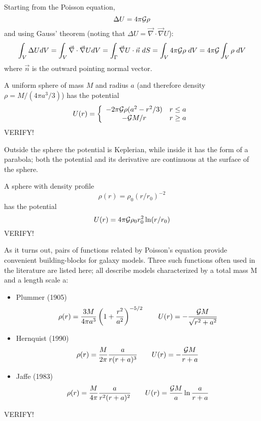 
Starting from the Poisson equation, 
\[
\Delta U = 4 \pi {\cal G} \rho
\]
and using Gauss' theorem (noting that $\Delta U=\vec\nabla\cdot \vec\nabla U$):
\[
\int_V \Delta U dV = \int_V \vec\nabla\cdot \vec\nabla U dV = 
\int_\Gamma \vec\nabla U \cdot \vec{n} \; dS
= \int_V 4 \pi {\cal G} \rho \; dV
= 4 \pi {\cal G} \int_V \rho \; dV
\]
where $\vec{n}$ is the outward pointing normal vector.

A uniform sphere of mass $M$ and radius $a$ (and therefore density $\rho=M/(4\pi a^3/3)$) 
has the potential
\[
U(r) =
\left\{
\begin{array}{cc}
-2\pi {\cal G} \rho (a^2-r^2/3) & r \le a \\
-{\cal G} M/r & r\ge a
\end{array}
\right.
\]
VERIFY!

Outside the sphere the potential is Keplerian, while inside it has the form of a parabola; 
both the potential and its derivative are continuous at the surface of the sphere.

A sphere with density profile 
\[
\rho(r) = \rho_0 (r/r_0)^{-2}
\]
has the potential 
\[
U(r) = 4\pi {\cal G} \rho_0 r_0^2 \ln (r/r_0)
\]
VERIFY!

As it turns out, pairs of functions related by Poisson's equation provide 
convenient building-blocks for galaxy models. 
Three such functions often used in the literature are listed here; all describe models characterized
by a total mass M and a length scale a:

\begin{itemize}
\item Plummer (1905) \cite{dejo87} 
\[
\rho(r)= \frac{3M}{4\pi a^3 }\left(1+\frac{r^2}{a^2} \right)^{-5/2}
\qquad
U(r)=-\frac{{\cal G}M}{\sqrt{r^2+a^2}}
\]
\item Hernquist (1990)
\[
\rho(r)=\frac{M}{2\pi} \frac{a}{r(r+a)^3} 
\qquad
U(r)=-\frac{{\cal G}M}{r+a}
\]
\item Jaffe (1983)
\[
\rho(r)=\frac{M}{4\pi} \frac{a}{r^2(r+a)^2} 
\qquad
U(r)=\frac{{\cal G}M}{a} \ln \frac{a}{r+a}
\]
\end{itemize}
VERIFY!

